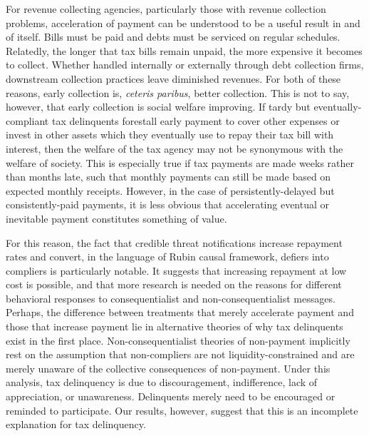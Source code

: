 \documentclass[12pt]{article}
\begin{document}
For revenue collecting agencies, particularly those with revenue collection 
problems, acceleration of payment can be understood to be a useful result 
in and of itself. Bills must be paid and debts must be serviced on regular 
schedules. Relatedly, the longer that tax bills remain unpaid, the more 
expensive it becomes to collect. Whether handled internally or externally 
through debt collection firms, downstream collection practices leave 
diminished revenues. For both of these reasons, early collection is, 
\textit{ceteris paribus}, better collection. This is not to say, 
however, that early collection is social welfare improving. If tardy 
but eventually-compliant tax delinquents forestall early payment to 
cover other expenses or invest in other assets which they eventually 
use to repay their tax bill with interest, then the welfare of the tax 
agency may not be synonymous with the welfare of society. This is 
especially true if tax payments are made weeks rather than months late, 
such that monthly payments can still be made based on expected monthly 
receipts. However, in the case of persistently-delayed but consistently-paid 
payments, it is less obvious that accelerating eventual or inevitable 
payment constitutes something of value. 

For this reason, the fact that credible threat notifications increase 
repayment rates and convert, in the language of Rubin causal framework, 
defiers into compliers is particularly notable. It suggests that 
increasing repayment at low cost is possible, and that more research is 
needed on the reasons for different behavioral responses to 
consequentialist and non-consequentialist messages. Perhaps, the difference 
between treatments that merely accelerate payment and those that increase 
payment lie in alternative theories of why tax delinquents exist in the 
first place. Non-consequentialist theories of non-payment implicitly rest 
on the assumption that non-compliers are not liquidity-constrained and are
merely unaware of the collective consequences of non-payment. Under this 
analysis, tax delinquency is due to discouragement, indifference, 
lack of appreciation, or unawareness. Delinquents merely need to be 
encouraged or reminded to participate. Our results, however, suggest 
that this is an incomplete explanation for tax delinquency. 
\end{document}
